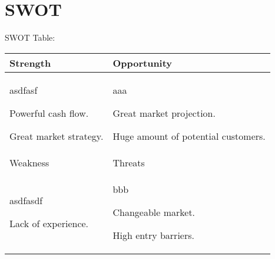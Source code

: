 \documentclass[11pt]{article}
\begin{document}
\newpage{}
\section{SWOT}
SWOT Table:



\begin{center}
\begin{tabular}{ | p{6cm} || p{6cm} | }
    \hline
    \hline
    Strength & Opportunity \\ \hline
    \hline
    asdfasf

Powerful cash flow.

Great market strategy.

 & aaa

Great market projection.

Huge amount of potential customers.

  \\[100pt] \hline
    \hline
    Weakness & Threats \\ \hline
    \hline
    asdfasdf			

Lack of experience.

 & bbb

Changeable market.

High entry barriers.

  \\[100pt] \hline
    \hline
  \end{tabular}
\end{center}
\end{document}
